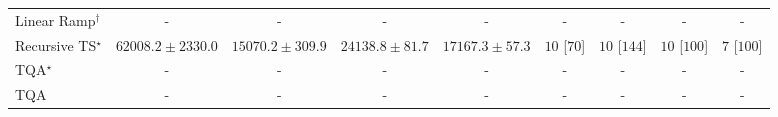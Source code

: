 \begin{tabular}{l|cccc|cccc|}
Linear Ramp$^\dagger$ & {\cellcolor[HTML]{000000}} \color[HTML]{F1F1F1} {\cellcolor{white}} \color{black} - & {\cellcolor[HTML]{000000}} \color[HTML]{F1F1F1} {\cellcolor{white}} \color{black} - & {\cellcolor[HTML]{000000}} \color[HTML]{F1F1F1} {\cellcolor{white}} \color{black} - & {\cellcolor[HTML]{000000}} \color[HTML]{F1F1F1} {\cellcolor{white}} \color{black} - & {\cellcolor[HTML]{000000}} \color[HTML]{F1F1F1} {\cellcolor{white}} \color{black} - & {\cellcolor[HTML]{000000}} \color[HTML]{F1F1F1} {\cellcolor{white}} \color{black} - & {\cellcolor[HTML]{000000}} \color[HTML]{F1F1F1} {\cellcolor{white}} \color{black} - & {\cellcolor[HTML]{000000}} \color[HTML]{F1F1F1} {\cellcolor{white}} \color{black} - \\
Recursive TS$^\star$ & {\cellcolor[HTML]{831A83}} \color[HTML]{F1F1F1} $62008.2\pm 2330.0$ & {\cellcolor[HTML]{F1F7FA}} \color[HTML]{000000} $15070.2\pm 309.9$ & {\cellcolor[HTML]{CEDFEC}} \color[HTML]{000000} $24138.8\pm 81.7$ & {\cellcolor[HTML]{EAF3F8}} \color[HTML]{000000} $17167.3\pm 57.3$ & {\cellcolor[HTML]{49006A}} \color[HTML]{F1F1F1} $10$ [$70$] & {\cellcolor[HTML]{49006A}} \color[HTML]{F1F1F1} $10$ [$144$] & {\cellcolor[HTML]{49006A}} \color[HTML]{F1F1F1} $10$ [$100$] & {\cellcolor[HTML]{CD238F}} \color[HTML]{F1F1F1} $7$ [$100$] \\
TQA$^\star$ & {\cellcolor[HTML]{000000}} \color[HTML]{F1F1F1} {\cellcolor{white}} \color{black} - & {\cellcolor[HTML]{000000}} \color[HTML]{F1F1F1} {\cellcolor{white}} \color{black} - & {\cellcolor[HTML]{000000}} \color[HTML]{F1F1F1} {\cellcolor{white}} \color{black} - & {\cellcolor[HTML]{000000}} \color[HTML]{F1F1F1} {\cellcolor{white}} \color{black} - & {\cellcolor[HTML]{000000}} \color[HTML]{F1F1F1} {\cellcolor{white}} \color{black} - & {\cellcolor[HTML]{000000}} \color[HTML]{F1F1F1} {\cellcolor{white}} \color{black} - & {\cellcolor[HTML]{000000}} \color[HTML]{F1F1F1} {\cellcolor{white}} \color{black} - & {\cellcolor[HTML]{000000}} \color[HTML]{F1F1F1} {\cellcolor{white}} \color{black} - \\
TQA & {\cellcolor[HTML]{000000}} \color[HTML]{F1F1F1} {\cellcolor{white}} \color{black} - & {\cellcolor[HTML]{000000}} \color[HTML]{F1F1F1} {\cellcolor{white}} \color{black} - & {\cellcolor[HTML]{000000}} \color[HTML]{F1F1F1} {\cellcolor{white}} \color{black} - & {\cellcolor[HTML]{000000}} \color[HTML]{F1F1F1} {\cellcolor{white}} \color{black} - & {\cellcolor[HTML]{000000}} \color[HTML]{F1F1F1} {\cellcolor{white}} \color{black} - & {\cellcolor[HTML]{000000}} \color[HTML]{F1F1F1} {\cellcolor{white}} \color{black} - & {\cellcolor[HTML]{000000}} \color[HTML]{F1F1F1} {\cellcolor{white}} \color{black} - & {\cellcolor[HTML]{000000}} \color[HTML]{F1F1F1} {\cellcolor{white}} \color{black} - \\

\end{tabular}
